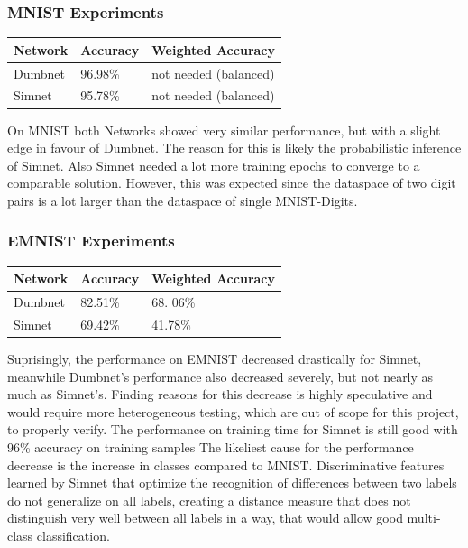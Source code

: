 ﻿\documentclass[a4paper,pt12]{article}
\begin{document}
\subsubsection{MNIST Experiments}
\begin{center}
    \begin{tabular}{| l | l | l | }
    \hline
    Network & Accuracy & Weighted Accuracy \\ \hline
    Dumbnet & 96.98\% & not needed (balanced) \\ \hline
	Simnet & 95.78\% & not needed (balanced) \\ \hline
    \end{tabular}
\end{center}

On MNIST both Networks showed very similar performance, but with a slight edge in favour of Dumbnet. The reason for this is likely the probabilistic inference of Simnet. Also Simnet needed a lot more training epochs to converge to a comparable solution. However, this was expected since the dataspace of two digit pairs is a lot larger than the dataspace of single MNIST-Digits. 

\subsubsection{EMNIST Experiments}
\begin{center}
    \begin{tabular}{| l | l | l | }
    \hline
    Network & Accuracy & Weighted Accuracy \\ \hline
    Dumbnet & 82.51\% & 68.
    06\% \\ \hline
	Simnet & 69.42\% & 41.78\% \\ \hline
    \end{tabular}
\end{center}

Suprisingly, the performance on EMNIST decreased drastically for Simnet, meanwhile Dumbnet’s performance also decreased severely, but not nearly as much as Simnet’s. \newline
Finding reasons for this decrease is highly speculative and would require more heterogeneous testing, which are out of scope for this project, to properly verify. The performance on training  time for Simnet is still good with 96\% accuracy on training samples The likeliest cause for the performance decrease is the increase in classes compared to MNIST. Discriminative features learned by Simnet that optimize the recognition of differences between two labels do not generalize on all labels, creating a distance measure that does not distinguish very well between all labels in a way, that would allow good multi-class classification. \newline
\end{document}
